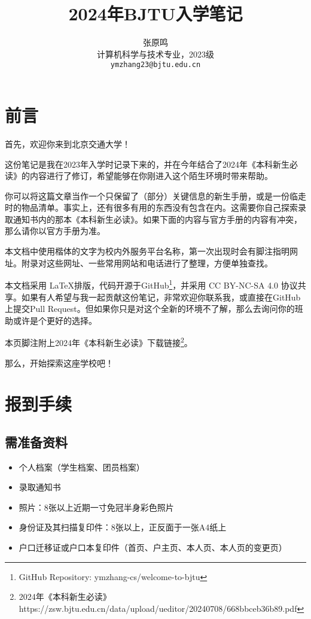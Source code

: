 \documentclass[a4paper]{ctexart}
\title{2024年BJTU入学笔记}
\author{张原鸣 \\ 计算机科学与技术专业，2023级 \\ \texttt{ymzhang23@bjtu.edu.cn}}
\begin{document}
\maketitle

\section{前言}

首先，欢迎你来到北京交通大学！

这份笔记是我在2023年入学时记录下来的，并在今年结合了2024年《本科新生必读》的内容进行了修订，希望能够在你刚进入这个陌生环境时带来帮助。

你可以将这篇文章当作一个只保留了（部分）关键信息的新生手册，或是一份临走时的物品清单。事实上，还有很多有用的东西没有包含在内。这需要你自己探索录取通知书内的那本《本科新生必读》。如果下面的内容与官方手册的内容有冲突，那么请你以官方手册为准。

本文档中使用楷体的文字为校内外服务平台名称，第一次出现时会有脚注指明网址。附录对这些网址、一些常用网站和电话进行了整理，方便单独查找。

本文档采用 \LaTeX 排版，代码开源于GitHub\footnote{GitHub Repository: ymzhang-cs/welcome-to-bjtu}，并采用 CC BY-NC-SA 4.0 协议共享。如果有人希望与我一起贡献这份笔记，非常欢迎你联系我，或直接在GitHub上提交Pull Request。但如果你只是对这个全新的环境不了解，那么去询问你的班助或许是个更好的选择。

本页脚注附上2024年《本科新生必读》下载链接\footnote{2024年《本科新生必读》 https://zsw.bjtu.edu.cn/data/upload/ueditor/20240708/668bbceb36b89.pdf}。

那么，开始探索这座学校吧！

\newpage

\section{报到手续}

\subsection{需准备资料}
\begin{itemize}
	\item 个人档案（学生档案、团员档案）
	\item 录取通知书
	\item 照片：8张以上近期一寸免冠半身彩色照片
	\item 身份证及其扫描复印件：8张以上，正反面于一张A4纸上
	\item 户口迁移证或户口本复印件（首页、户主页、本人页、本人页的变更页）
\end{itemize}
\end{document}
